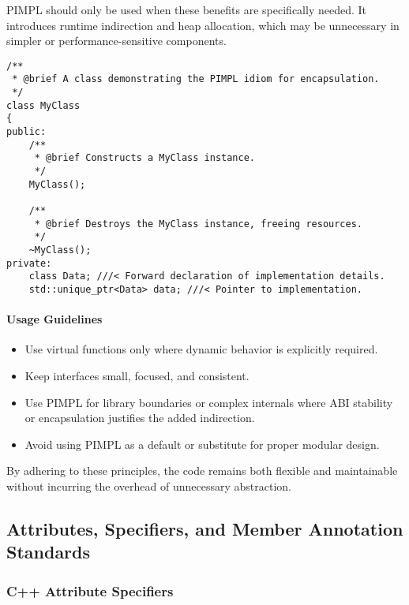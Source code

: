 PIMPL should only be used when these benefits are specifically needed. It introduces runtime indirection and heap allocation, which may be unnecessary in simpler or performance-sensitive components.
\begin{lstlisting}[style=cppstyle]
/**
 * @brief A class demonstrating the PIMPL idiom for encapsulation.
 */
class MyClass 
{
public:
    /**
     * @brief Constructs a MyClass instance.
     */
    MyClass();
    
    /**
     * @brief Destroys the MyClass instance, freeing resources.
     */
    ~MyClass();
private:
    class Data; ///< Forward declaration of implementation details.
    std::unique_ptr<Data> data; ///< Pointer to implementation.
\end{lstlisting}

\paragraph{Usage Guidelines}

\begin{itemize}\itemsep0em
    \item Use virtual functions only where dynamic behavior is explicitly required.
    \item Keep interfaces small, focused, and consistent.
    \item Use PIMPL for library boundaries or complex internals where ABI stability or encapsulation justifies the added indirection.
    \item Avoid using PIMPL as a default or substitute for proper modular design.
\end{itemize}

By adhering to these principles, the code remains both flexible and maintainable without incurring the overhead of unnecessary abstraction.



\subsection{Attributes, Specifiers, and Member Annotation Standards}

\subsubsection*{C++ Attribute Specifiers}

